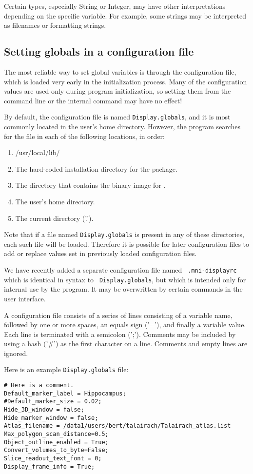 Certain types, especially String or Integer, may have other
interpretations depending on the specific variable. For example, some
strings may be interpreted as filenames or formatting strings.

\subsection{Setting globals in a configuration file}
The most reliable way to set global variables is through the configuration file, which is loaded very early in the initialization process. Many of the configuration values are used only during program initialization, so setting them from the command line or the internal command may have no effect!

By default, the configuration file is named {\tt Display.globals}, and
it is most commonly located in the user's home directory. However, the 
program searches for the file in each of the following locations, in order:
\begin{enumerate}
\item /usr/local/lib/
\item The hard-coded installation directory for the package.
\item The directory that contains the binary image for \display.
\item The user's home directory.
\item The current directory ('.').
\end{enumerate}

Note that if a file named {\tt Display.globals} is present in any of these
directories, each such file will be loaded. Therefore it is possible
for later configuration files to add or replace values set in
previously loaded configuration files.

We have recently added a separate configuration file named {\tt
  .mni-displayrc} which is identical in syntax to {\tt
  Display.globals}, but which is intended only for internal use by the
program. It may be overwritten by certain commands in the user interface.

A configuration file consists of a series of lines consisting of a
variable name, followed by one or more spaces, an equals sign ('='),
and finally a variable value. Each line is terminated with a semicolon
(';'). Comments may be included by using a hash ('\#') as the first character
on a line. Comments and empty lines are ignored.

Here is an example {\tt Display.globals} file:
\begin{verbatim}
# Here is a comment.
Default_marker_label = Hippocampus;
#Default_marker_size = 0.02;
Hide_3D_window = false;
Hide_marker_window = false;
Atlas_filename = /data1/users/bert/talairach/Talairach_atlas.list
Max_polygon_scan_distance=0.5;
Object_outline_enabled = True;
Convert_volumes_to_byte=False;
Slice_readout_text_font = 0;
Display_frame_info = True;
\end{verbatim}


